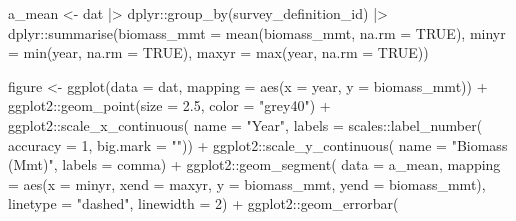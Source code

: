 \documentclass[
  letterpaper,
  oneside,
  open=any]{scrbook}
\newenvironment{Shaded}{\begin{snugshade}}{\end{snugshade}}
\newcommand{\AttributeTok}[1]{\textcolor[rgb]{0.40,0.45,0.13}{#1}}
\newcommand{\ConstantTok}[1]{\textcolor[rgb]{0.56,0.35,0.01}{#1}}
\newcommand{\DecValTok}[1]{\textcolor[rgb]{0.68,0.00,0.00}{#1}}
\newcommand{\FloatTok}[1]{\textcolor[rgb]{0.68,0.00,0.00}{#1}}
\newcommand{\FunctionTok}[1]{\textcolor[rgb]{0.28,0.35,0.67}{#1}}
\newcommand{\NormalTok}[1]{\textcolor[rgb]{0.00,0.23,0.31}{#1}}
\newcommand{\OtherTok}[1]{\textcolor[rgb]{0.00,0.23,0.31}{#1}}
\newcommand{\SpecialCharTok}[1]{\textcolor[rgb]{0.37,0.37,0.37}{#1}}
\newcommand{\StringTok}[1]{\textcolor[rgb]{0.13,0.47,0.30}{#1}}
\begin{document}
\begin{Shaded}
\begin{Highlighting}[]
\NormalTok{a\_mean }\OtherTok{\textless{}{-}}\NormalTok{ dat }\SpecialCharTok{|\textgreater{}} 
\NormalTok{  dplyr}\SpecialCharTok{::}\FunctionTok{group\_by}\NormalTok{(survey\_definition\_id) }\SpecialCharTok{|\textgreater{}} 
\NormalTok{  dplyr}\SpecialCharTok{::}\FunctionTok{summarise}\NormalTok{(}\AttributeTok{biomass\_mmt =} \FunctionTok{mean}\NormalTok{(biomass\_mmt, }\AttributeTok{na.rm =} \ConstantTok{TRUE}\NormalTok{), }
                   \AttributeTok{minyr =} \FunctionTok{min}\NormalTok{(year, }\AttributeTok{na.rm =} \ConstantTok{TRUE}\NormalTok{), }
                   \AttributeTok{maxyr =} \FunctionTok{max}\NormalTok{(year, }\AttributeTok{na.rm =} \ConstantTok{TRUE}\NormalTok{)) }

\NormalTok{figure }\OtherTok{\textless{}{-}}
  \FunctionTok{ggplot}\NormalTok{(}\AttributeTok{data =}\NormalTok{ dat, }
         \AttributeTok{mapping =} \FunctionTok{aes}\NormalTok{(}\AttributeTok{x =}\NormalTok{ year, }
                       \AttributeTok{y =}\NormalTok{ biomass\_mmt)) }\SpecialCharTok{+}
\NormalTok{  ggplot2}\SpecialCharTok{::}\FunctionTok{geom\_point}\NormalTok{(}\AttributeTok{size =} \FloatTok{2.5}\NormalTok{, }\AttributeTok{color =} \StringTok{"grey40"}\NormalTok{) }\SpecialCharTok{+} 
\NormalTok{  ggplot2}\SpecialCharTok{::}\FunctionTok{scale\_x\_continuous}\NormalTok{(}
    \AttributeTok{name =} \StringTok{"Year"}\NormalTok{, }
    \AttributeTok{labels =}\NormalTok{ scales}\SpecialCharTok{::}\FunctionTok{label\_number}\NormalTok{(}
      \AttributeTok{accuracy =} \DecValTok{1}\NormalTok{, }
      \AttributeTok{big.mark =} \StringTok{""}\NormalTok{))   }\SpecialCharTok{+}
\NormalTok{  ggplot2}\SpecialCharTok{::}\FunctionTok{scale\_y\_continuous}\NormalTok{(}
    \AttributeTok{name =} \StringTok{"Biomass (Mmt)"}\NormalTok{, }
    \AttributeTok{labels =}\NormalTok{ comma) }\SpecialCharTok{+}
\NormalTok{  ggplot2}\SpecialCharTok{::}\FunctionTok{geom\_segment}\NormalTok{(}
    \AttributeTok{data =}\NormalTok{ a\_mean,}
    \AttributeTok{mapping =} \FunctionTok{aes}\NormalTok{(}\AttributeTok{x =}\NormalTok{ minyr, }
                  \AttributeTok{xend =}\NormalTok{ maxyr, }
                  \AttributeTok{y =}\NormalTok{ biomass\_mmt, }
                  \AttributeTok{yend =}\NormalTok{ biomass\_mmt),}
    \AttributeTok{linetype =} \StringTok{"dashed"}\NormalTok{, }
    \AttributeTok{linewidth =} \DecValTok{2}\NormalTok{) }\SpecialCharTok{+}
\NormalTok{  ggplot2}\SpecialCharTok{::}\FunctionTok{geom\_errorbar}\NormalTok{(}

\end{Highlighting}
\end{Shaded}
\end{document}
